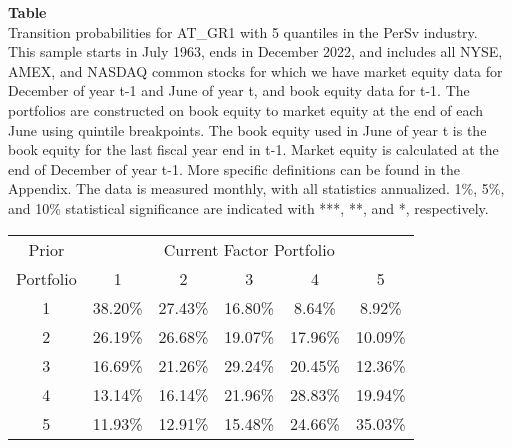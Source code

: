 \begin{table*}[ht!]
\raggedright
{}
\label{tab: transition_probs_AT_GR1_PerSv_with_5_quantiles}
\textbf{Table \thetable} \\
Transition probabilities for AT_GR1 with 5 quantiles in the PerSv industry. \\
\hspace*{1em}This sample starts in July 1963, ends in December 2022, and includes all NYSE, AMEX, and NASDAQ common stocks for which we have market equity data for December of year t-1 and June of year t, and book equity data for t-1. The portfolios are constructed on book equity to market equity at the end of each June using quintile breakpoints.  The book equity used in June of year t is the book equity for the last fiscal year end in t-1.  Market equity is calculated at the end of December of year t-1.  More specific definitions can be found in the Appendix.  The data is measured monthly, with all statistics annualized.  1\%, 5\%, and 10\% statistical significance are indicated with ***, **, and *, respectively. \\
\vspace{0.5em}
\centering
\begin{adjustbox}{max width=\textwidth}
\begin{tabular}{@{}cccccc@{}}
\toprule
Prior & \multicolumn{5}{c}{Current Factor Portfolio} \\
Portfolio & 1 & 2 & 3 & 4 & 5 \\
\midrule
1 & 38.20\% & 27.43\% & 16.80\% & 8.64\% & 8.92\% \\
2 & 26.19\% & 26.68\% & 19.07\% & 17.96\% & 10.09\% \\
3 & 16.69\% & 21.26\% & 29.24\% & 20.45\% & 12.36\% \\
4 & 13.14\% & 16.14\% & 21.96\% & 28.83\% & 19.94\% \\
5 & 11.93\% & 12.91\% & 15.48\% & 24.66\% & 35.03\% \\
\bottomrule
\end{tabular}
\end{adjustbox}
\end{table*}